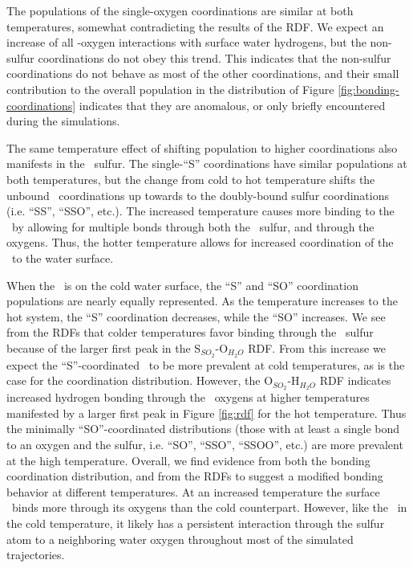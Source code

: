 The populations of the single-oxygen coordinations are similar at both temperatures, somewhat contradicting the results of the RDF. We expect an increase of all \suldiox-oxygen interactions with surface water hydrogens, but the non-sulfur coordinations do not obey this trend. This indicates that the non-sulfur coordinations do not behave as most of the other coordinations, and their small contribution to the overall population in the distribution of Figure \ref{fig:bonding-coordinations} indicates that they are anomalous, or only briefly encountered during the simulations.

The same temperature effect of shifting population to higher coordinations also manifests in the \suldiox~sulfur. The single-``S'' coordinations have similar populations at both temperatures, but the change from cold to hot temperature shifts the unbound \suldiox~coordinations up towards to the doubly-bound sulfur coordinations (i.e. ``SS'', ``SSO'', etc.). The increased temperature causes more binding to the \suldiox~by allowing for multiple bonds through both the \suldiox~sulfur, and through the oxygens. Thus, the hotter temperature allows for increased coordination of the \suldiox~to the water surface.

When the \suldiox~is on the cold water surface, the ``S'' and ``SO'' coordination populations are nearly equally represented. As the temperature increases to the hot system, the ``S'' coordination decreases, while the ``SO'' increases. We see from the RDFs that colder temperatures favor binding through the \suldiox~sulfur because of the larger first peak in the S$_{SO_2}$-O$_{H_2O}$ RDF. From this increase we expect the ``S''-coordinated \suldiox~to be more prevalent at cold temperatures, as is the case for the coordination distribution. However, the O$_{SO_2}$-H$_{H_2O}$ RDF indicates increased hydrogen bonding through the \suldiox~oxygens at higher temperatures manifested by a larger first peak in Figure \ref{fig:rdf} for the hot temperature. Thus the minimally ``SO''-coordinated distributions (those with at least a single bond to an oxygen and the sulfur, i.e. ``SO'', ``SSO'', ``SSOO'', etc.) are more prevalent at the high temperature. Overall, we find evidence from both the bonding coordination distribution, and from the RDFs to suggest a modified bonding behavior at different temperatures. At an increased temperature the surface \suldiox~binds more through its oxygens than the cold counterpart. However, like the \suldiox~in the cold temperature, it likely has a persistent interaction through the sulfur atom to a neighboring water oxygen throughout most of the simulated trajectories.
